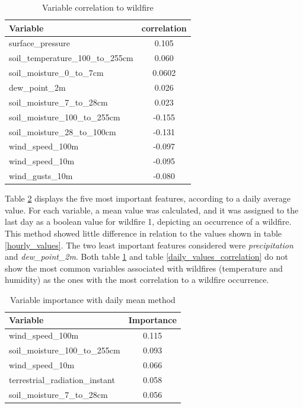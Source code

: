 \begin{table}[H]
	\caption{Variable correlation to wildfire}
	\centering
	\label{hourly_values_correlation}
	\begin{tabular}{lc}
		\hline
		Variable                       & \multicolumn{1}{l}{correlation} \\ \hline
		surface\_pressure                             & 0.105                          \\
		soil\_temperature\_100\_to\_255cm                            & 0.060                          \\
		soil\_moisture\_0\_to\_7cm & 0.0602                          \\
		dew\_point\_2m                            & 0.026                          \\
		soil\_moisture\_7\_to\_28cm              & 0.023   \\
		soil\_moisture\_100\_to\_255cm & -0.155 \\
		soil\_moisture\_28\_to\_100cm & -0.131 \\
		wind\_speed\_100m & -0.097 \\
		wind\_speed\_10m & -0.095 \\
		wind\_gusts\_10m & -0.080 \\                   
	\end{tabular}
\end{table}



Table \ref{daily_values} displays the five most important features, according to a daily average value. For each variable, a mean value was calculated, and it was assigned to the last day as a boolean value for wildfire 1, depicting an occurrence of a wildfire. This method showed little difference in relation to the values shown in table \ref{hourly_values}. The two least important features considered were \textit{precipitation} and \textit{dew\_point\_2m}. Both table \ref{hourly_values_correlation} and table \ref{daily_values_correlation} do not show the most common variables associated with wildfires (temperature and humidity) as the ones with the most correlation to a wildfire occurrence. 
\begin{table}[H]
	\caption{Variable importance with daily mean method}
	\centering
	\label{daily_values}
	\begin{tabular}{lc}
		\hline
		Variable                        & \multicolumn{1}{l}{Importance} \\ \hline
		wind\_speed\_100m  & 0.115                          \\
		soil\_moisture\_100\_to\_255cm   & 0.093                          \\
		wind\_speed\_10m          & 0.066                          \\
		terrestrial\_radiation\_instant               & 0.058                          \\
		soil\_moisture\_7\_to\_28cm & 0.056                         
	\end{tabular}
\end{table}


